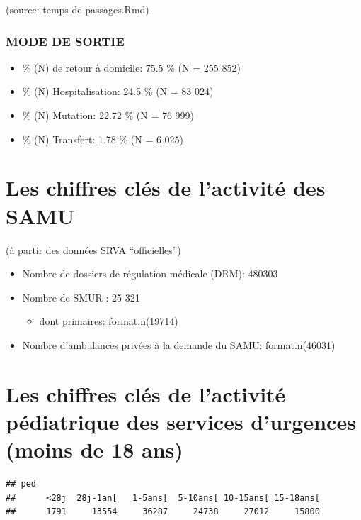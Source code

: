 \documentclass[]{article}
\begin{document}
(source: temps de passages.Rmd)

\subsubsection{MODE DE SORTIE}\label{mode-de-sortie}

\begin{itemize}
\itemsep1pt\parskip0pt
\item
  \% (N) de retour à domicile: 75.5 \% (N = 255 852)
\item
  \% (N) Hospitalisation: 24.5 \% (N = 83 024)
\item
  \% (N) Mutation: 22.72 \% (N = 76 999)
\item
  \% (N) Transfert: 1.78 \% (N = 6 025)
\end{itemize}

\section{Les chiffres clés de l'activité des
SAMU}\label{les-chiffres-cles-de-lactivite-des-samu}

(à partir des données SRVA ``officielles'')

\begin{itemize}
\itemsep1pt\parskip0pt
\item
  Nombre de dossiers de régulation médicale (DRM): 480303
\item
  Nombre de SMUR : 25 321

  \begin{itemize}
  \itemsep1pt\parskip0pt
  \item
    dont primaires: format.n(19714)
  \end{itemize}
\item
  Nombre d'ambulances privées à la demande du SAMU: format.n(46031)
\end{itemize}

\section{Les chiffres clés de l'activité pédiatrique des services
d'urgences (moins de 18
ans)}\label{les-chiffres-cles-de-lactivite-pediatrique-des-services-durgences-moins-de-18-ans}

\begin{verbatim}
## ped
##      <28j  28j-1an[   1-5ans[  5-10ans[ 10-15ans[ 15-18ans[ 
##      1791     13554     36287     24738     27012     15800
\end{verbatim}
\end{document}
